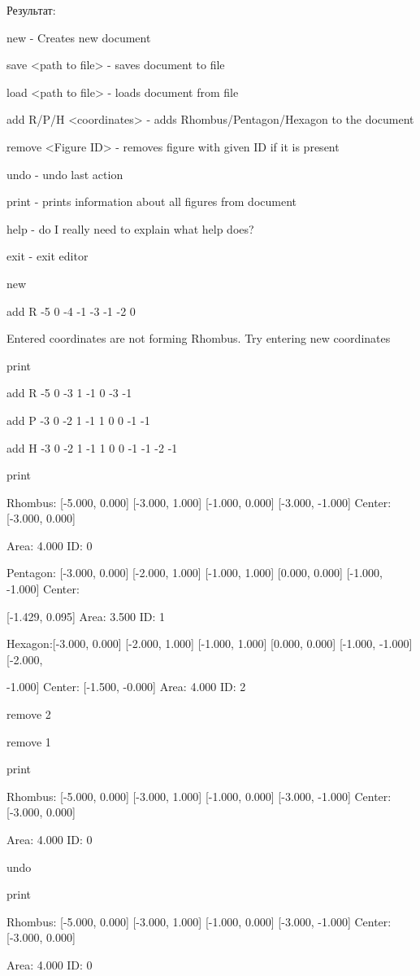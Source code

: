 \documentclass[a4paper, 12pt]{article}
\begin{document}
Результат:

new - Creates new document

save <path to file> - saves document to file

load <path to file> - loads document from file

add R/P/H <coordinates> - adds Rhombus/Pentagon/Hexagon to the document

remove <Figure ID> - removes figure with given ID if it is present

undo - undo last action

print - prints information about all figures from document

help - do I really need to explain what help does?

exit - exit editor

new

add R -5 0 -4 -1 -3 -1 -2 0

Entered coordinates are not forming Rhombus. Try entering new coordinates

print

add R -5 0 -3 1 -1 0 -3 -1

add P -3 0 -2 1 -1 1 0 0 -1 -1

add H -3 0 -2 1 -1 1 0 0 -1 -1 -2 -1 

print

Rhombus: [-5.000, 0.000] [-3.000, 1.000] [-1.000, 0.000] [-3.000, -1.000] Center: [-3.000, 0.000] 

Area: 4.000 ID: 0

Pentagon: [-3.000, 0.000] [-2.000, 1.000] [-1.000, 1.000] [0.000, 0.000] [-1.000, -1.000] Center: 

[-1.429, 0.095] Area: 3.500 ID: 1


Hexagon:[-3.000, 0.000] [-2.000, 1.000] [-1.000, 1.000] [0.000, 0.000] [-1.000, -1.000] [-2.000, 

-1.000] Center: [-1.500, -0.000] Area: 4.000 ID: 2

remove 2

remove 1

print

Rhombus: [-5.000, 0.000] [-3.000, 1.000] [-1.000, 0.000] [-3.000, -1.000] Center: [-3.000, 0.000] 

Area: 4.000 ID: 0

undo

print

Rhombus: [-5.000, 0.000] [-3.000, 1.000] [-1.000, 0.000] [-3.000, -1.000] Center: [-3.000, 0.000] 

Area: 4.000 ID: 0
\end{document}
